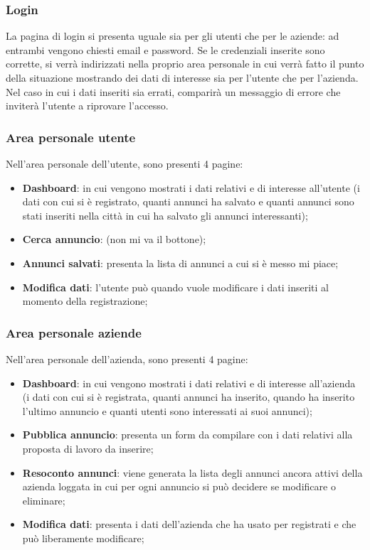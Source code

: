 		\subsubsection{Login}
		La pagina di login si presenta uguale sia per gli utenti che per le aziende: ad entrambi vengono chiesti email e password. Se le credenziali inserite sono corrette, si verrà indirizzati nella proprio area personale in cui verrà fatto il punto della situazione mostrando dei dati di interesse sia per l'utente che per l'azienda. Nel caso in cui i dati inseriti sia errati, comparirà un messaggio di errore che inviterà l'utente a riprovare l'accesso.
		\subsubsection{Area personale utente}
		Nell'area personale dell'utente, sono presenti 4 pagine:
		\begin{itemize}
			\item \textbf{Dashboard}: in cui vengono mostrati i dati relativi e di interesse all'utente (i dati con cui si è registrato, quanti annunci ha salvato e quanti annunci sono stati inseriti nella città in cui ha salvato gli annunci interessanti);
			\item \textbf{Cerca annuncio}: (non mi va il bottone);
			\item \textbf{Annunci salvati}: presenta la lista di annunci a cui si è messo mi piace;
			\item \textbf{Modifica dati}: l'utente può quando vuole modificare i dati inseriti al momento della registrazione; 
		\end{itemize}

		\subsubsection{Area personale aziende}
		Nell'area personale dell'azienda, sono presenti 4 pagine:
		\begin{itemize}
			\item \textbf{Dashboard}: in cui vengono mostrati i dati relativi e di interesse all'azienda (i dati con cui si è registrata, quanti annunci ha inserito, quando ha inserito l'ultimo annuncio e quanti utenti sono interessati ai suoi annunci);
			\item \textbf{Pubblica annuncio}: presenta un form da compilare con i dati relativi alla proposta di lavoro da inserire;
			\item \textbf{Resoconto annunci}: viene generata la lista degli annunci ancora attivi della azienda loggata in cui per ogni annuncio si può decidere se modificare o eliminare;
			\item \textbf{Modifica dati}: presenta i dati dell'azienda che ha usato per registrati e che può liberamente modificare;
		\end{itemize}
